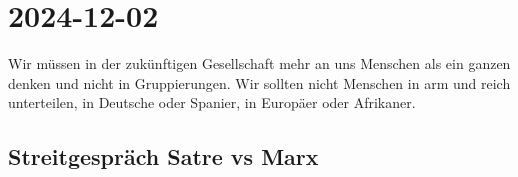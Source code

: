 \section{2024-12-02}

Wir müssen in der zukünftigen Gesellschaft mehr an uns Menschen als ein ganzen
denken und nicht in Gruppierungen. Wir sollten nicht Menschen in arm und reich
unterteilen, in Deutsche oder Spanier, in Europäer oder Afrikaner.

\subsection{Streitgespräch Satre vs Marx}


